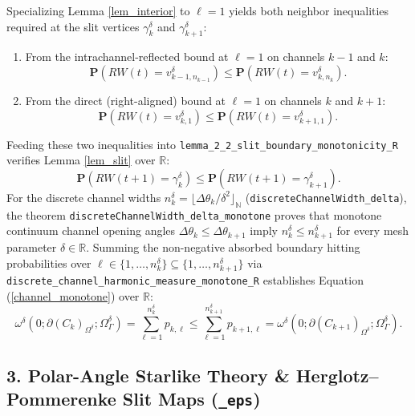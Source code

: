 \documentclass[]{amsart}
\numberwithin{equation}{section}
\newcommand{\R}{\mathbb{R}}
\newcommand{\N}{\mathbb{N}}
\begin{document}
Specializing Lemma \ref{lem_interior} to $\ell = 1$ yields both neighbor inequalities required at the slit vertices $\gamma^{\delta}_k$ and $\gamma^{\delta}_{k+1}$:
\begin{enumerate}
\item From the intrachannel-reflected bound at $\ell = 1$ on channels $k-1$ and $k$:
\[
\mathbf{P}(RW(t) = v^{\delta}_{k-1, n_{k-1}}) \le \mathbf{P}(RW(t) = v^{\delta}_{k, n_k}).
\]
\item From the direct (right-aligned) bound at $\ell = 1$ on channels $k$ and $k+1$:
\[
\mathbf{P}(RW(t) = v^{\delta}_{k, 1}) \le \mathbf{P}(RW(t) = v^{\delta}_{k+1, 1}).
\]
\end{enumerate}
Feeding these two inequalities into \texttt{lemma\_2\_2\_slit\_boundary\_monotonicity\_R} verifies Lemma \ref{lem_slit} over $\R$:
\[
\mathbf{P}(RW(t+1) = \gamma^{\delta}_k) \le \mathbf{P}(RW(t+1) = \gamma^{\delta}_{k+1}).
\]
For the discrete channel widths $n_k^{\delta} = \lfloor \Delta\theta_k / \delta^2 \rfloor_{\N}$ (\texttt{discreteChannelWidth\_delta}), the theorem \texttt{discreteChannelWidth\_delta\_monotone} proves that monotone continuum channel opening angles $\Delta\theta_k \le \Delta\theta_{k+1}$ imply $n_k^{\delta} \le n_{k+1}^{\delta}$ for every mesh parameter $\delta \in \R$. Summing the non-negative absorbed boundary hitting probabilities over $\ell \in \{1, \dots, n_k^{\delta}\} \subseteq \{1, \dots, n_{k+1}^{\delta}\}$ via \texttt{discrete\_channel\_harmonic\_measure\_monotone\_R} establishes Equation (\ref{channel_monotone}) over $\R$:
\[
\omega^{\delta}(0 ; \partial (C_k)_{\Omega^{\delta}}; \varOmega^{\delta}_{\varGamma})
= \sum_{\ell=1}^{n_k^{\delta}} p_{k,\ell}
\le \sum_{\ell=1}^{n_{k+1}^{\delta}} p_{k+1,\ell}
= \omega^{\delta}(0 ; \partial (C_{k+1})_{\Omega^{\delta}}; \varOmega^{\delta}_{\varGamma}).
\]

\subsection*{3. Polar-Angle Starlike Theory \& Herglotz--Pommerenke Slit Maps (\texttt{\_eps})}
\end{document}
